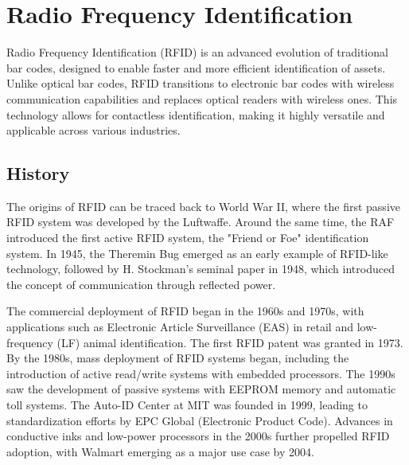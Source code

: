 \section{Radio Frequency Identification}

Radio Frequency Identification (RFID) is an advanced evolution of traditional bar codes, designed to enable faster and more efficient identification of assets.
Unlike optical bar codes, RFID transitions to electronic bar codes with wireless communication capabilities and replaces optical readers with wireless ones. 
This technology allows for contactless identification, making it highly versatile and applicable across various industries.

\subsection{History}
The origins of RFID can be traced back to World War II, where the first passive RFID system was developed by the Luftwaffe.
Around the same time, the RAF introduced the first active RFID system, the "Friend or Foe" identification system.
In 1945, the Theremin Bug emerged as an early example of RFID-like technology, followed by H. Stockman's seminal paper in 1948, which introduced the concept of communication through reflected power.

The commercial deployment of RFID began in the 1960s and 1970s, with applications such as Electronic Article Surveillance (EAS) in retail and low-frequency (LF) animal identification. 
The first RFID patent was granted in 1973. By the 1980s, mass deployment of RFID systems began, including the introduction of active read/write systems with embedded processors. 
The 1990s saw the development of passive systems with EEPROM memory and automatic toll systems. 
The Auto-ID Center at MIT was founded in 1999, leading to standardization efforts by EPC Global (Electronic Product Code). 
Advances in conductive inks and low-power processors in the 2000s further propelled RFID adoption, with Walmart emerging as a major use case by 2004.

